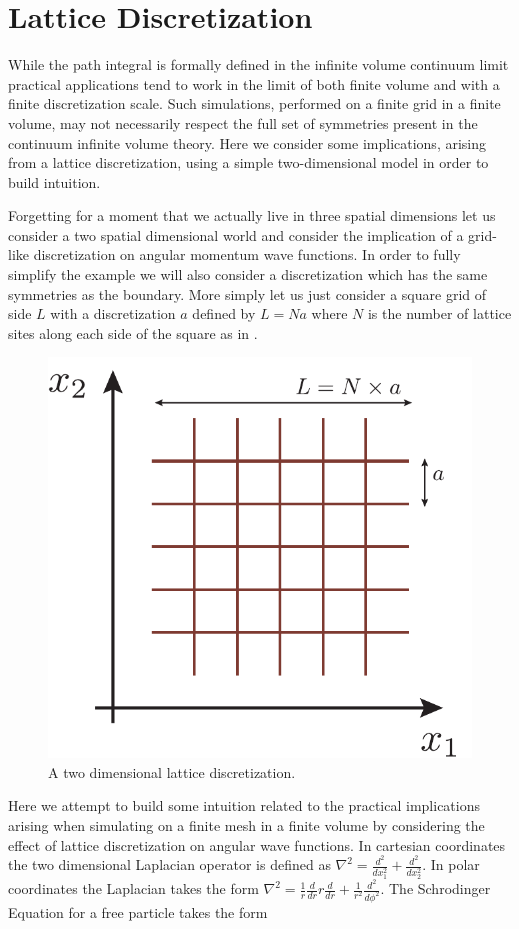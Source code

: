 

\section{Lattice Discretization} \label{QCD::lattice_discretization} 
While the path integral is formally defined in the infinite volume continuum limit practical applications tend to work in the limit of both finite volume and with a finite discretization scale. Such simulations, performed on a finite grid in a finite volume, may not necessarily respect the full set of symmetries present in the continuum infinite volume theory. Here we consider some implications, arising from a lattice discretization, using a simple two-dimensional model in order to build intuition. 

Forgetting for a moment that we actually live in three spatial dimensions let us consider a two spatial dimensional world and consider the implication of a grid-like discretization on angular momentum wave functions. In order to fully simplify the example we will also consider a discretization which has the same symmetries as the boundary. More simply let us just consider a square grid of side $L$ with a discretization $a$ defined by $L = Na$ where $N$ is the number of lattice sites along each side of the square as in . 

\begin{figure}[htbp]
\centering
\includegraphics[width=0.5\linewidth]{figures/2DLattice/2dLattice.pdf}
\caption{ A two dimensional lattice discretization. \label{fig::2Dlattice}}
\end{figure}

Here we attempt to build some intuition related to the practical implications arising when simulating on a finite mesh in a finite volume by considering the effect of lattice discretization on angular wave functions. In cartesian coordinates the two dimensional Laplacian operator is defined as $\nabla^2 = \frac{d^2}{dx_1^2} + \frac{d^2}{dx_2^2}$. In polar coordinates the Laplacian takes the form $\nabla^2 = \frac{1}{r}\frac{d}{dr} r \frac{d}{dr} + \frac{1}{r^2} \frac{d^2}{d\phi^2}$. The Schrodinger Equation for a free particle takes the form 

